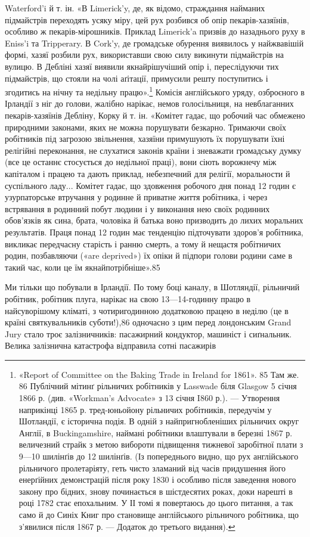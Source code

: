 \parcont{}  %
Waterford’i й т. ін. «В Limerick’y, де, як відомо, страждання
найманих підмайстрів переходять усяку міру, цей рух розбився
об опір пекарів-хазяїнів, особливо ж пекарів-мірошників. Приклад
Limerick’a призвів до назаднього руху в Eniss’i та Tripperary.
В Cork’y, де громадське обурення виявилось у найжвавішій
формі, хазяї розбили рух, використавши свою силу викинути підмайстрів
на вулицю. В Дебліні хазяї виявили якнайрішучіший
опір і, переслідуючи тих підмайстрів, що стояли на чолі аґітації,
примусили решту поступитись і згодитись на нічну та недільну
працю».\footnote{
«Report of Committee on the Baking Trade in Ireland for 1861».
85 Там же.
86 Публічний мітинґ рільничих робітників у Lasswade біля Glasgow
5 січня 1866 р. (див. «Workman’s Advocate» з 13 січня I860 р.). — Утворення
наприкінці 1865 р. тред-юньойону рільничих робітників, передучім
у Шотландії, є історична подія. В одній з найпригнобленіших рільничих
округ Англії, в Buckingamshire, наймані робітники влаштували
в березні 1867 р. величезний страйк з метою вибороти підвищення тижневої
заробітної плати з 9—10 шилінґів до 12 шилінґів. (Із попереднього
видно, що рух англійського рільничого пролетаріяту, геть чисто зламаний
від часів придушення його енерґійних демонстрацій після року 1830
і особливо після заведення нового закону про бідних, знову починається
в шістдесятих роках, доки нарешті в році 1782 стає епохальним. У ІІ томі
я повертаюсь до цього питання, а так само й до Синіх Книг про становище
англійського рільничого робітника, що з’явилися після 1867 р. — Додаток
до третього видання).
} Комісія англійського уряду, озброєного в Ірландії
з ніг до голови, жалібно нарікає, немов голосільниця, на невблаганних
пекарів-хазяїнів Дебліну, Корку й т. ін. «Комітет гадає,
що робочий час обмежено природними законами, яких не можна
порушувати безкарно. Тримаючи своїх робітників під загрозою
звільнення, хазяїни примушують їх порушувати їхні релігійні
переконання, не слухатися законів країни і зневажати громадську
думку (все це останнє стосується до недільної праці), вони сіють
ворожнечу між капіталом і працею та дають приклад, небезпечний
для релігії, моральности й суспільного ладу... Комітет гадає,
що здовження робочого дня понад 12 годин є узурпаторське втручання
у родинне й приватне життя робітника, і через встрявання
в родинний побут людини і у виконання нею своїх родинних обов’язків
як сина, брата, чоловіка й батька воно призводить до лихих
моральних результатів. Праця понад 12 годин має тенденцію підточувати
здоров’я робітника, викликає передчасну старість і
ранню смерть, а тому й нещастя робітничих родин, позбавляючи
(«are deprived») їх опіки й підпори голови родини саме в такий
час, коли це їм якнайпотрібніше».85

Ми тільки що побували в Ірландії. По тому боці каналу, в
Шотляндії, рільничий робітник, робітник плуга, нарікає на свою
13—14-годинну працю в найсуворішому кліматі, з чотиригодинною
додатковою працею в неділю (це в країні святкувальників
суботи!),86 одночасно з цим перед лондонським Grand Jury стало
троє залізничників: пасажирний кондуктор, машиніст і сиґнальник.
Велика залізнична катастрофа відправила сотні пасажирів
\parbreak{}  %
